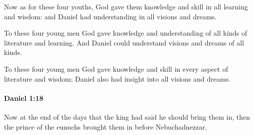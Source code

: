 			\begin{versebox}
					\item[BHS] 
					\item[LXX] 
					\item[ASV] Now as for these four youths, God gave them knowledge and skill in all learning and wisdom: and Daniel had understanding in all visions and dreams.
					\item[NIV] To these four young men God gave knowledge and understanding of all kinds of literature and learning. And Daniel could understand visions and dreams of all kinds.
					\item[NRSV] To these four young men God gave knowledge and skill in every aspect of literature and wisdom; Daniel also had insight into all visions and dreams.
			\end{versebox}

		\paragraph{Daniel 1:18} %
			\label{DANIEL-1-18}

			Now at the end of the days that the king had said he should bring them in, then the prince of the eunuchs brought them in before Nebuchadnezzar.

